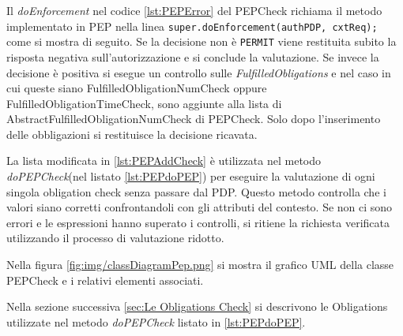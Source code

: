 Il \emph{doEnforcement} nel codice \ref{lst:PEPError} del PEPCheck richiama il metodo implementato in \ac{PEP}
nella linea \texttt{super.doEnforcement(authPDP, cxtReq);} come si mostra di seguito.
Se la decisione non è \texttt{PERMIT} viene restituita subito la risposta negativa sull'autorizzazione e si conclude la valutazione.
Se invece la decisione è positiva si esegue un controllo sulle \emph{FulfilledObligations} e
nel caso in cui queste siano FulfilledObligationNumCheck oppure FulfilledObligationTimeCheck,
sono aggiunte alla lista di AbstractFulfilledObligationNumCheck di PEPCheck. Solo dopo l'inserimento delle obbligazioni
si restituisce la decisione ricavata.

La lista modificata in \ref{lst:PEPAddCheck} è utilizzata nel metodo \emph{doPEPCheck}(nel listato \ref{lst:PEPdoPEP})
per eseguire la valutazione di ogni singola obligation check senza passare dal \ac{PDP}.
Questo metodo controlla che i valori siano corretti confrontandoli con gli attributi del contesto. Se non ci
sono errori e le espressioni hanno superato i controlli, si ritiene la richiesta verificata
utilizzando il processo di valutazione ridotto.

Nella figura \ref{fig:img/classDiagramPep.png} si mostra il grafico UML della classe PEPCheck e i relativi elementi
associati.

Nella sezione successiva \ref{sec:Le Obligations Check} si descrivono le Obligations utilizzate
nel metodo \emph{doPEPCheck} listato in \ref{lst:PEPdoPEP}.

